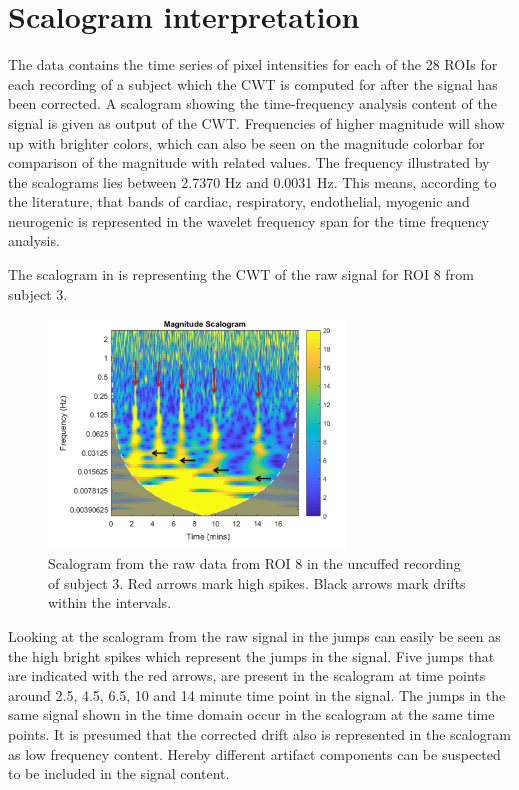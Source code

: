 \section{Scalogram interpretation}
\label{sec:scalogram}
The data contains the time series of pixel intensities for each of the 28 ROIs for each recording of a subject which the CWT is computed for after the signal has been corrected.  
A scalogram showing the time-frequency analysis content of the signal is given as output of the CWT. Frequencies of higher magnitude will show up with brighter colors, which can also be seen on the magnitude colorbar for comparison of the magnitude with related values.
The frequency illustrated by the scalograms lies between 2.7370 Hz and 0.0031 Hz. This means, according to the literature, that bands of cardiac, respiratory, endothelial, myogenic and neurogenic is represented in the wavelet frequency span for the time frequency analysis. \cite{geyer2004, sagaidachnyi2014}

The scalogram in  is representing the CWT of the raw signal for ROI 8 from subject 3.

\begin{figure}[H]
	\includegraphics[width=0.7\textwidth]{figures/uncuffed_sub3_roi8_uncorr}
	\caption{Scalogram from the raw data from ROI 8 in the uncuffed recording of subject 3. Red arrows mark high spikes. Black arrows mark drifts within the intervals.}
	\label{fig:scalogram_uncorr}
\end{figure}

Looking at the scalogram from the raw signal in  the jumps can easily be seen as the high bright spikes which represent the jumps in the signal. Five jumps that are indicated with the red arrows, are present in the scalogram at time points around 2.5, 4.5, 6.5, 10 and 14 minute time point in the signal. The jumps in the same signal shown in the time domain occur in the scalogram at the same time points. It is presumed that the corrected drift also is represented in the scalogram as low frequency content. Hereby different artifact components can be suspected to be included in the signal content. 

